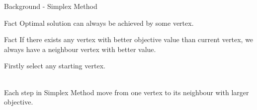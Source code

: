 \documentclass{beamer}
\begin{document}
\begin{frame}{Background - Simplex Method}
    \begin{exampleblock}{Fact}
    Optimal solution can always be achieved by some vertex.
    \end{exampleblock}

    \begin{exampleblock}{Fact}
    If there exists any vertex with better objective value than current vertex, we always have a neighbour vertex with better value.
    \end{exampleblock}

    Firstly select any starting vertex. \\~\

    Each step in Simplex Method move from one vertex to its neighbour with larger objective.



\end{frame}

\end{document}
